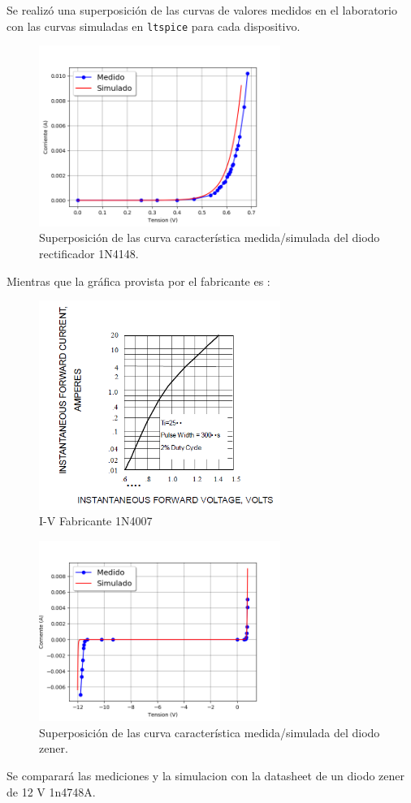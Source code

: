 \documentclass[a4paper]{article}
\begin{document}
Se realizó una superposición de las curvas de valores medidos en el laboratorio con las curvas simuladas en \texttt{ltspice} para cada dispositivo.

\begin{figure}[H]
	\centering
	\includegraphics[width=0.7\textwidth]{CurvaDiodoRectificador.png}
	\caption{Superposición de las curva característica medida/simulada del diodo rectificador 1N4148.}
	\label{fig:diodorect}
\end{figure}
Mientras que la gráfica provista por el fabricante es : 
\begin{figure}[H]
	\centering
	\includegraphics[width=0.7\textwidth]{IV1N4007.PNG}
	\caption{I-V Fabricante 1N4007}
	\label{fig:diodozenfab}
\end{figure}

\begin{figure}[H]
	\centering
	\includegraphics[width=0.7\textwidth]{CurvaZenerEntera.png}
	\caption{Superposición de las curva característica medida/simulada del diodo zener.}
	\label{fig:diodozen}
\end{figure}
Se comparará las mediciones y la simulacion con la datasheet de un diodo zener de 12 V 1n4748A.
\end{document}

